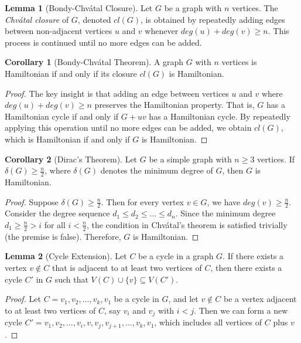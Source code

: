 \documentclass{article}
\theoremstyle{definition}
\def\deg{deg}%
\newtheorem{lemma}{Lemma}
\newtheorem{corollary}{Corollary}
\begin{document}
\begin{lemma}[Bondy-Chvátal Closure]
Let $G$ be a graph with $n$ vertices. The \emph{Chvátal closure} of $G$, denoted $cl(G)$, is obtained by repeatedly adding edges between non-adjacent vertices $u$ and $v$ whenever $\deg(u) + \deg(v) \geq n$. This process is continued until no more edges can be added.
\end{lemma}

\begin{corollary}[Bondy-Chvátal Theorem]
A graph $G$ with $n$ vertices is Hamiltonian if and only if its closure $cl(G)$ is Hamiltonian.
\end{corollary}

\begin{proof}
The key insight is that adding an edge between vertices $u$ and $v$ where $\deg(u) + \deg(v) \geq n$ preserves the Hamiltonian property. That is, $G$ has a Hamiltonian cycle if and only if $G + uv$ has a Hamiltonian cycle. By repeatedly applying this operation until no more edges can be added, we obtain $cl(G)$, which is Hamiltonian if and only if $G$ is Hamiltonian.
\end{proof}

\begin{corollary}[Dirac's Theorem]
Let $G$ be a simple graph with $n \geq 3$ vertices. If $\delta(G) \geq \frac{n}{2}$, where $\delta(G)$ denotes the minimum degree of $G$, then $G$ is Hamiltonian.
\end{corollary}

\begin{proof}
Suppose $\delta(G) \geq \frac{n}{2}$. Then for every vertex $v \in G$, we have $\deg(v) \geq \frac{n}{2}$. Consider the degree sequence $d_1 \leq d_2 \leq \ldots \leq d_n$. Since the minimum degree $d_1 \geq \frac{n}{2} > i$ for all $i < \frac{n}{2}$, the condition in Chvátal's theorem is satisfied trivially (the premise is false). Therefore, $G$ is Hamiltonian.
\end{proof}

\begin{lemma}[Cycle Extension]
Let $C$ be a cycle in a graph $G$. If there exists a vertex $v \not\in C$ that is adjacent to at least two vertices of $C$, then there exists a cycle $C'$ in $G$ such that $V(C) \cup \{v\} \subseteq V(C')$.
\end{lemma}

\begin{proof}
Let $C = v_1, v_2, \ldots, v_k, v_1$ be a cycle in $G$, and let $v \not\in C$ be a vertex adjacent to at least two vertices of $C$, say $v_i$ and $v_j$ with $i < j$. Then we can form a new cycle $C' = v_1, v_2, \ldots, v_i, v, v_j, v_{j+1}, \ldots, v_k, v_1$, which includes all vertices of $C$ plus $v$.
\end{proof}
\end{document}
